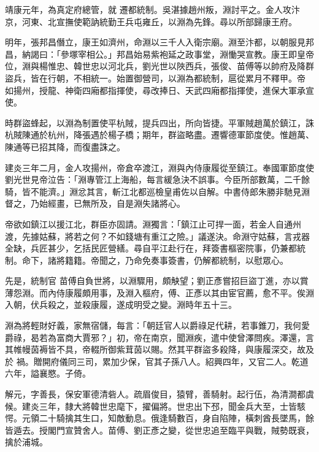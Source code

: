\begin{pinyinscope}
 靖康元年，為真定府總管，就
 遷都統制。吳湛據趙州叛，淵討平之。金人攻汴京，河東、北宣撫使範訥統勤王兵屯雍丘，以淵為先鋒。尋以所部歸康王府。



 明年，張邦昌僭立，康王如濟州，命淵以三千人入衛宗廟。淵至汴都，以朝服見邦昌，納謁曰：「參塚宰相公。」邦昌始易紫袍延之政事堂，淵慟哭宣教。康王即皇帝位，淵與楊惟忠、韓世忠以河北兵，劉光世以陜西兵，張俊、苗傅等以帥府及降群盜兵，皆在行朝，不相統一。始置御營司，以淵為都統制，扈從累月不釋甲。帝
 如揚州，授龍、神衛四廂都指揮使，尋改捧日、天武四廂都指揮使，進保大軍承宣使。



 時群盜蜂起，以淵為制置使平杭賊，提兵四出，所向皆捷。平軍賊趙萬於鎮江，誅杭賊陳通於杭州，降張遇於楊子橋；期年，群盜略盡。遷響德軍節度使。惟趙萬、陳通等已招其降，而復盡誅之。



 建炎三年二月，金人攻揚州，帝倉卒渡江，淵與內侍康履從至鎮江。奉國軍節度使劉光世見帝泣告：「淵專管江上海船，每言緩急決不誤事。今臣所部數萬，二千餘
 騎，皆不能濟。」淵忿其言，斬江北都巡檢皇甫佐以自解。中書侍郎朱勝非馳見淵督之，乃始經畫，已無所及，自是淵失諸將心。



 帝欲如鎮江以援江北，群臣亦固請。淵獨言：「鎮江止可捍一面，若金人自通州渡，先據姑蘇，將若之何？不如錢塘有重江之險。」議遂決。命淵守姑蘇，言戎器全缺，兵匠甚少，乞括民匠營繕。尋自平江赴行在，拜簽書樞密院事，仍兼都統制。命下，諸將籍籍。帝聞之，乃命免奏事簽書，仍解都統制，以慰眾心。



 先是，統制官
 苗傅自負世將，以淵驟用，頗觖望；劉正彥嘗招巨盜丁進，亦以賞薄怨淵。而內侍康履頗用事，及淵入樞府，傅、正彥以其由宦官薦，愈不平。俟淵入朝，伏兵殺之，並殺康履，遂成明受之變。淵時年五十三。



 淵為將輕財好義，家無宿儲，每言：「朝廷官人以爵祿足代耕，若事錐刀，我何愛爵祿，曷若為富商大賈邪？」初，帝在南京，聞淵疾，遣中使曾澤問疾。澤還，言其帷幔茵褥皆不具，帝輟所御紫茸茵以賜。然其平群盜多殺降，與康履深交，故及於
 禍。贈開府儀同三司，累加少保，官其子孫八人。紹興四年，又官二人。乾道六年，謚襄愍。子倚。



 解元，字善長，保安軍德清砦人。疏眉俊目，猿臂，善騎射。起行伍，為清澗都虞候。建炎三年，隸大將韓世忠麾下，擢偏將。世忠出下邳，聞金兵大至，士皆駭愕。元領二十騎擒其生口，知敵動息。俄逢騎數百，身自陷陣，橫刺酋長墜馬，餘皆遁去。授閣門宣贊舍人。苗傅、劉正彥之變，從世忠追至臨平與戰，賊勢既衰，擒於浦城。




\end{pinyinscope}
